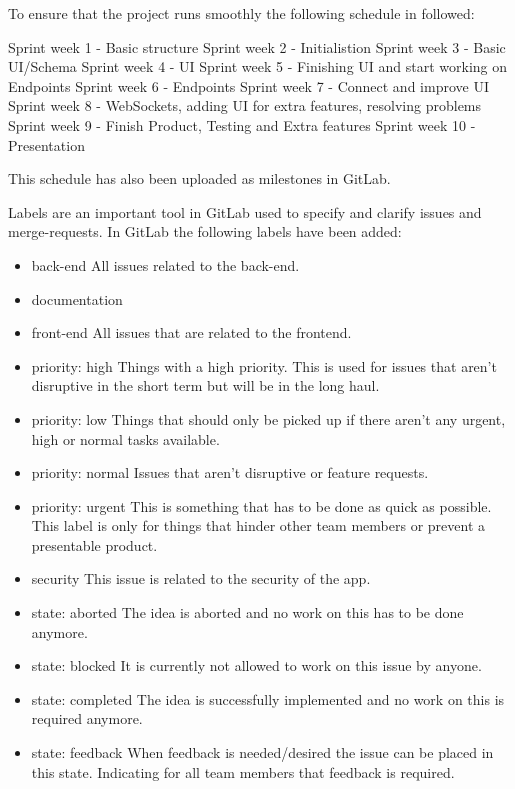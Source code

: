 \documentclass[sigconf,nonacm]{acmart}
\begin{document}
To ensure that the project runs smoothly the following schedule in followed:

Sprint week 1 - Basic structure
Sprint week 2 - Initialistion
Sprint week 3 - Basic UI/Schema
Sprint week 4 - UI
Sprint week 5 - Finishing UI and start working on Endpoints
Sprint week 6 - Endpoints
Sprint week 7 - Connect and improve UI
Sprint week 8 - WebSockets, adding UI for extra features, resolving problems
Sprint week 9 - Finish Product, Testing and Extra features
Sprint week 10 - Presentation

This schedule has also been uploaded as milestones in GitLab.

Labels are an important tool in GitLab used to specify and clarify issues and merge-requests. In GitLab the following labels have been added:

\begin{itemize}
    \item back-end              All issues related to the back-end.
    \item documentation
    \item front-end             All issues that are related to the frontend.
    \item priority: high        Things with a high priority. This is used for issues that aren't disruptive in the short term but will be in the long haul.
    \item priority: low         Things that should only be picked up if there aren't any urgent, high or normal tasks available.
    \item priority: normal      Issues that aren't disruptive or feature requests.
    \item priority: urgent      This is something that has to be done as quick as possible. This label is only for things that hinder other team members or prevent a presentable product.
    \item security              This issue is related to the security of the app.
    \item state: aborted        The idea is aborted and no work on this has to be done anymore.
    \item state: blocked        It is currently not allowed to work on this issue by anyone.
    \item state: completed      The idea is successfully implemented and no work on this is required anymore.
    \item state: feedback       When feedback is needed/desired the issue can be placed in this state. Indicating for all team members that feedback is required.

\end{itemize}
\end{document}
